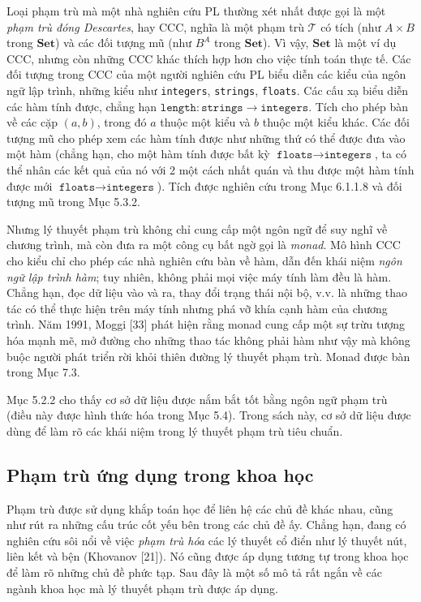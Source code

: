 Loại phạm trù mà một nhà nghiên cứu PL thường xét nhất được gọi là một \emph{phạm trù đóng Descartes}, hay CCC, nghĩa là một phạm trù $\mathcal T$ có tích (như $A\times B$ trong $\mathbf{Set}$) và các đối tượng mũ (như $B^A$ trong $\mathbf{Set}$). Vì vậy, $\mathbf{Set}$ là một ví dụ CCC, nhưng còn những CCC khác thích hợp hơn cho việc tính toán thực tế. Các đối tượng trong CCC của một người nghiên cứu PL biểu diễn các kiểu của ngôn ngữ lập trình, những kiểu như \texttt{integers}, \texttt{strings}, \texttt{floats}. Các cấu xạ biểu diễn các hàm tính được, chẳng hạn $\texttt{length}:\texttt{strings}\to\texttt{integers}$. Tích cho phép bàn về các cặp $(a,b)$, trong đó $a$ thuộc một kiểu và $b$ thuộc một kiểu khác. Các đối tượng mũ cho phép xem các hàm tính được như những thứ có thể được đưa vào một hàm (chẳng hạn, cho một hàm tính được bất kỳ $\texttt{floats}\to\texttt{integers}$, ta có thể nhân các kết quả của nó với 2 một cách nhất quán và thu được một hàm tính được mới $\texttt{floats}\to\texttt{integers}$). Tích được nghiên cứu trong Mục 6.1.1.8 và đối tượng mũ trong Mục 5.3.2.

Nhưng lý thuyết phạm trù không chỉ cung cấp một ngôn ngữ để suy nghĩ về chương trình, mà còn đưa ra một công cụ bất ngờ gọi là \emph{monad}. Mô hình CCC cho kiểu chỉ cho phép các nhà nghiên cứu bàn về hàm, dẫn đến khái niệm \emph{ngôn ngữ lập trình hàm}; tuy nhiên, không phải mọi việc máy tính làm đều là hàm. Chẳng hạn, đọc dữ liệu vào và ra, thay đổi trạng thái nội bộ, v.v. là những thao tác có thể thực hiện trên máy tính nhưng phá vỡ khía cạnh hàm của chương trình. Năm 1991, Moggi [33] phát hiện rằng monad cung cấp một sự trừu tượng hóa mạnh mẽ, mở đường cho những thao tác không phải hàm như vậy mà không buộc người phát triển rời khỏi thiên đường lý thuyết phạm trù. Monad được bàn trong Mục 7.3.

Mục 5.2.2 cho thấy cơ sở dữ liệu được nắm bắt tốt bằng ngôn ngữ phạm trù (điều này được hình thức hóa trong Mục 5.4). Trong sách này, cơ sở dữ liệu được dùng để làm rõ các khái niệm trong lý thuyết phạm trù tiêu chuẩn.
\subsection{Phạm trù ứng dụng trong khoa học}
Phạm trù được sử dụng khắp toán học để liên hệ các chủ đề khác nhau, cũng như rút ra những cấu trúc cốt yếu bên trong các chủ đề ấy. Chẳng hạn, đang có nghiên cứu sôi nổi về việc \emph{phạm trù hóa} các lý thuyết cổ điển như lý thuyết nút, liên kết và bện (Khovanov [21]). Nó cũng được áp dụng tương tự trong khoa học để làm rõ những chủ đề phức tạp. Sau đây là một số mô tả rất ngắn về các ngành khoa học mà lý thuyết phạm trù được áp dụng.

